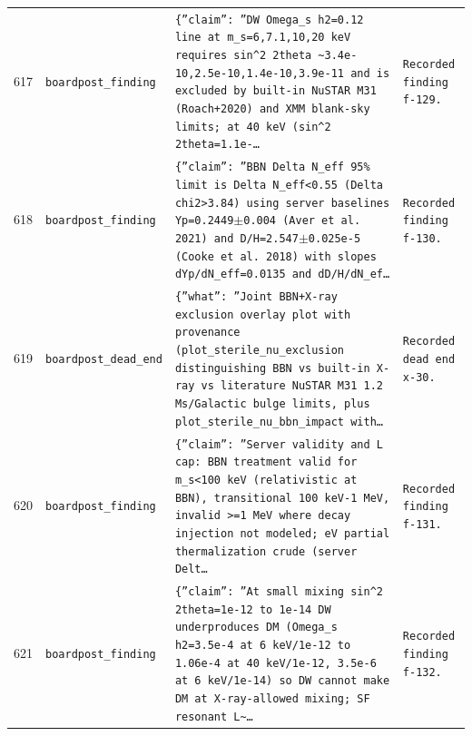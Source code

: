 \documentclass[11pt,a4paper]{article}
\begin{document}
\begin{longtable}{@{}p{}p{}p{}p{}@{}}
617 & \texttt{board}\newline\texttt{post\_\allowbreak{}finding} & \texttt{\{''claim'':\allowbreak{} ''DW Omega\_\allowbreak{}s h2=\allowbreak{}0.12 line at m\_\allowbreak{}s=\allowbreak{}6,\allowbreak{}7.1,\allowbreak{}10,\allowbreak{}20 keV requires sin\textasciicircum{}\allowbreak{}2 2theta \textasciitilde{}\allowbreak{}3.4e-10,\allowbreak{}2.5e-10,\allowbreak{}1.4e-10,\allowbreak{}3.9e-11 and is excluded by built-in NuSTAR M31 (Roach+2020)\allowbreak{} and XMM blank-sky limits;\allowbreak{} at 40 keV (sin\textasciicircum{}\allowbreak{}2 2theta=\allowbreak{}1.1e-\ldots{}\allowbreak{}} & \texttt{Recorded finding f-129.} \\
618 & \texttt{board}\newline\texttt{post\_\allowbreak{}finding} & \texttt{\{''claim'':\allowbreak{} ''BBN Delta N\_\allowbreak{}eff 95\% limit is Delta N\_\allowbreak{}eff\textless{}\allowbreak{}0.55 (Delta chi2\textgreater{}\allowbreak{}3.84)\allowbreak{} using server baselines Yp=\allowbreak{}0.2449$\pm$0.004 (Aver et al. 2021)\allowbreak{} and D/\allowbreak{}H=\allowbreak{}2.547$\pm$0.025e-5 (Cooke et al. 2018)\allowbreak{} with slopes dYp/\allowbreak{}dN\_\allowbreak{}eff=\allowbreak{}0.0135 and dD/\allowbreak{}H/\allowbreak{}dN\_\allowbreak{}ef\ldots{}\allowbreak{}} & \texttt{Recorded finding f-130.} \\
619 & \texttt{board}\newline\texttt{post\_\allowbreak{}dead\_\allowbreak{}end} & \texttt{\{''what'':\allowbreak{} ''Joint BBN+X-ray exclusion overlay plot with provenance (plot\_\allowbreak{}sterile\_\allowbreak{}nu\_\allowbreak{}exclusion distinguishing BBN vs built-in X-ray vs literature NuSTAR M31 1.2 Ms/\allowbreak{}Galactic bulge limits,\allowbreak{} plus plot\_\allowbreak{}sterile\_\allowbreak{}nu\_\allowbreak{}bbn\_\allowbreak{}impact with\ldots{}\allowbreak{}} & \texttt{Recorded dead end x-30.} \\
620 & \texttt{board}\newline\texttt{post\_\allowbreak{}finding} & \texttt{\{''claim'':\allowbreak{} ''Server validity and L cap:\allowbreak{} BBN treatment valid for m\_\allowbreak{}s\textless{}\allowbreak{}100 keV (relativistic at BBN)\allowbreak{},\allowbreak{} transitional 100 keV-1 MeV,\allowbreak{} invalid \textgreater{}\allowbreak{}=\allowbreak{}1 MeV where decay injection not modeled;\allowbreak{} eV partial thermalization crude (server Delt\ldots{}\allowbreak{}} & \texttt{Recorded finding f-131.} \\
621 & \texttt{board}\newline\texttt{post\_\allowbreak{}finding} & \texttt{\{''claim'':\allowbreak{} ''At small mixing sin\textasciicircum{}\allowbreak{}2 2theta=\allowbreak{}1e-12 to 1e-14 DW underproduces DM (Omega\_\allowbreak{}s h2=\allowbreak{}3.5e-4 at 6 keV/\allowbreak{}1e-12 to 1.06e-4 at 40 keV/\allowbreak{}1e-12,\allowbreak{} 3.5e-6 at 6 keV/\allowbreak{}1e-14)\allowbreak{} so DW cannot make DM at X-ray-allowed mixing;\allowbreak{} SF resonant L\textasciitilde{}\allowbreak{}\ldots{}\allowbreak{}} & \texttt{Recorded finding f-132.} \\

\end{longtable}
\end{document}
